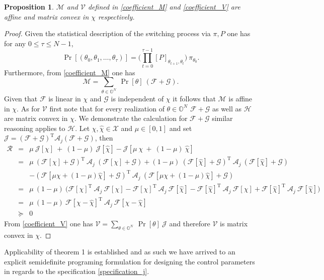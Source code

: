 \documentclass[letterpaper,11pt]{article}
\newcommand{\T}{\mathrm{T}}
\newtheorem{proposition}[theorem]{Proposition}
\newtheorem{proof}{Proof}
\begin{document}
\begin{proposition}
$ \mathcal{M} $ and $\mathcal{V}$ defined in \eqref{coefficient_M}  and \eqref{coefficient_V} are affine and matrix convex in $\chi$ respectively. 
\end{proposition}

\begin{proof}
Given the statistical description of the switching process via $ \pi, P  $ one has 
for any $ 0 \leq \tau \leq N-1$,
\begin{equation}
\label{probability_path}
\Pr[ (\theta_0 , \theta_1, \hdots , \theta_\tau)] = 
\bigg(\prod_{t=0}^{\tau-1} 
[P]_{\theta_{t+1}, \theta_{t}}\bigg) ~ \pi_{\theta_0} .
\end{equation}
Furthermore, from \eqref{coefficient_M} one has
$$
\mathcal{M} = \sum_{\theta
	\in \mathbb{O}^N} ~ \Pr[\theta ] ~ (\mathcal{F} + \mathcal{G}).
$$
Given that $ \mathcal{F}$ is linear in $\chi$ and $\mathcal{G}$ is independent of $\chi$ it follows that
$ \mathcal{M}$ is affine in $\chi$.
As for $\mathcal{V}$ first note that for every realization of $\theta \in \mathbb{O}^N$ $ \mathcal{F} + \mathcal{G}$ 
as well as $ \mathcal{H}$ are matrix convex in $ \chi$. We demonstrate the calculation for $ \mathcal{F} + \mathcal{G}$ 
similar reasoning applies to $\mathcal{H}$.
Let $ \chi , \hat{\chi} \in \mathcal{X}$ and $ \mu \in [0,1]$ and set $ \mathcal{J} = (\mathcal{F} + \mathcal{G})^{\T}  \mathcal{A}_j (\mathcal{F} + \mathcal{G})$, then
\begin{eqnarray*}
	\mathcal{R}& = & 
	\mu ~ \mathcal{J}[\chi] ~+~ (1-\mu)~ \mathcal{J}[\hat{\chi}] - 
	\mathcal{J}[\mu ~ \chi ~+~ (1-\mu)~ \hat{\chi}] 	\\
	& = & 
	\mu ~ (\mathcal{F}[\chi] + \mathcal{G})^\T ~ \mathcal{A}_j ~ 
	(\mathcal{F}[\chi] + \mathcal{G}) + (1-\mu) ~ 
	(\mathcal{F}[\hat{\chi}] + \mathcal{G})^\T ~ \mathcal{A}_j ~ 
	(\mathcal{F}[\hat{\chi}] + \mathcal{G}) \\
	&& - (\mathcal{F}[\mu  \chi + (1- \mu) \hat{\chi}  ] + \mathcal{G})^\T ~ 
	\mathcal{A}_j ~ 
	(\mathcal{F}[\mu  \chi + (1- \mu) \hat{\chi}  ] + \mathcal{G}) \\
	& = & \mu ~ (1 - \mu) ~ \bigg( \mathcal{F}[\chi]^\T ~  \mathcal{A}_j ~ \mathcal{F}[\chi] - \mathcal{F}[\chi]^\T ~  \mathcal{A}_j ~ \mathcal{F}[\hat{\chi}]  -  \mathcal{F}[\hat{\chi}]^\T ~  \mathcal{A}_j ~ \mathcal{F}[\chi]  +   \mathcal{F}[\hat{\chi}]^\T ~  \mathcal{A}_j ~ \mathcal{F}[\hat{\chi}]\bigg) \\
	&=& \mu ~ (1 - \mu) ~ \mathcal{F}[\chi - \hat{\chi}]^\T ~ \mathcal{A}_j ~\mathcal{F}[\chi - \hat{\chi}] \\
	&\succeq& 0
\end{eqnarray*}
From \eqref{coefficient_V} one has 
$
\mathcal{V}  = \sum_{\theta 
	\in \mathbb{O}^N} ~ \Pr[\theta ] ~ \mathcal{J}
$
and therefore $ \mathcal{V} $ is matrix convex in $ \chi$. 
\end{proof}
Applicability of theorem 1 is established and as such we have arrived to an explicit semidefinite programing formulation for designing the control parameters in regards to the specification
\eqref{specification_j}.
\end{document}
